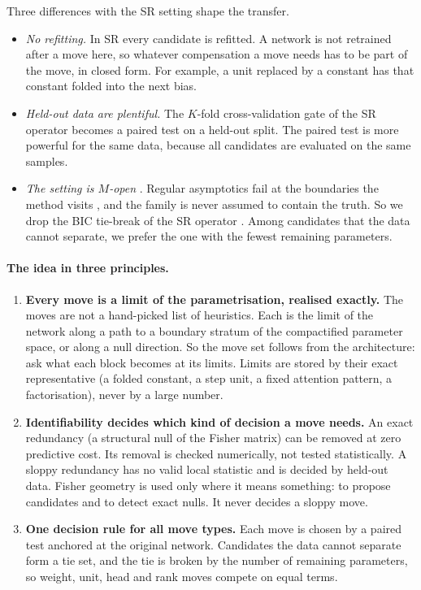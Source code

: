\documentclass[11pt,a4paper]{article}
\theoremstyle{definition}
\begin{document}
Three differences with the SR setting shape the transfer.
\begin{itemize}
\item \emph{No refitting.} In SR every candidate is refitted. A network is not
retrained after a move here, so whatever compensation a move needs has to be part of
the move, in closed form. For example, a unit replaced by a constant has that constant
folded into the next bias.
\item \emph{Held-out data are plentiful.} The $K$-fold cross-validation gate of the SR
operator becomes a paired test on a held-out split. The paired test is more powerful
for the same data, because all candidates are evaluated on the same samples.
\item \emph{The setting is $M$-open} \citep{bernardo1994bayesian}. Regular asymptotics
fail at the boundaries the method visits
\citep{chernoff1954distribution,self1987asymptotic,watanabe2009algebraic}, and the
family is never assumed to contain the truth. So we drop the BIC tie-break of the SR
operator \citep{schwarz1978estimating,grunwald2017inconsistency}. Among candidates
that the data cannot separate, we prefer the one with the fewest remaining parameters.
\end{itemize}

\paragraph{The idea in three principles.}
\begin{enumerate}[label=\textbf{P\arabic*.}]
\item \textbf{Every move is a limit of the parametrisation, realised exactly.} The
moves are not a hand-picked list of heuristics. Each is the limit of the network along
a path to a boundary stratum of the compactified parameter space, or along a null
direction. So the move set follows from the architecture: ask what each block becomes
at its limits. Limits are stored by their exact representative (a folded constant, a
step unit, a fixed attention pattern, a factorisation), never by a large number.
\item \textbf{Identifiability decides which kind of decision a move needs.} An exact
redundancy (a structural null of the Fisher matrix) can be removed at zero predictive
cost. Its removal is checked numerically, not tested statistically. A sloppy
redundancy has no valid local statistic and is decided by held-out data. Fisher
geometry is used only where it means something: to propose candidates and to detect
exact nulls. It never decides a sloppy move.
\item \textbf{One decision rule for all move types.} Each move is chosen by a paired
test anchored at the original network. Candidates the data cannot separate form a tie
set, and the tie is broken by the number of remaining parameters, so weight, unit,
head and rank moves compete on equal terms.
\end{enumerate}
\end{document}
